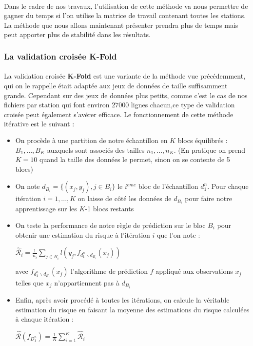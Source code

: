 \documentclass[14pt, openany]{article}
\begin{document}
\paragraph{}
Dans le cadre de nos travaux, l'utilisation de cette méthode va nous permettre de gagner du temps si l'on utilise la matrice de travail contenant toutes les stations. La méthode que nous allons maintenant présenter prendra plus de temps mais peut apporter plus de stabilité dans les résultats.
\subsubsection{La validation croisée K-Fold}
\paragraph{}
La validation croisée \textbf{K-Fold} est une variante de la méthode vue précédemment, qui on le rappelle était adaptée aux jeux de données de taille suffisamment grande. Cependant sur des jeux de données plus petits, comme c'est le cas de nos fichiers par station qui font environ $27000$ lignes chacun,ce type de validation croisée peut également s'avérer efficace. Le fonctionnement de cette méthode itérative est le suivant :
\begin{itemize}
\item On procède à une partition de notre échantillon en $K$ blocs équilibrés : $B_1,...,B_K$ auxquels sont associés des tailles $n_1,...,n_K$. (En pratique on prend $K=10$ quand la taille des données le permet, sinon on se contente de 5 blocs)
\item On note $d_{B_i}=\{(x_j,y_j), j \in B_i\}$ le $i^{eme}$ bloc  de l'échantillon $d^{n}_{1}$. Pour chaque itération $i = 1,...,K$ on laisse de côté les données de $d_{B_i}$ pour faire notre apprentissage sur les $K$-1 blocs restants
\item On teste la performance de notre règle de prédiction sur le bloc $B_i$ pour obtenir une estimation du risque à l'itération $i$ que l'on note :
\begin{center}
$\widehat{\mathcal{R}}_i = \frac{1}{n_i} \sum\limits_{j \in B_i} l(y_j,f_{d^{n}_{1}\backslash d_{B_i}}(x_j))$
\end{center}
avec $f_{d^{n}_{1}\backslash d_{B_i}}(x_j)$ l'algorithme de prédiction $f$ appliqué aux observations $x_j$ telles que $x_j$ n'appartiennent pas à $d_{B_i}$
\item Enfin, après avoir procédé à toutes les itérations, on calcule la véritable estimation du risque en faisant la moyenne des estimations du risque calculées à chaque itération :
\begin{center}
$\widehat{\mathcal{R}}(f_{D^{n}_{1}}) = \frac{1}{K} \sum\limits_{i=1}^K \widehat{\mathcal{R}}_i$
\end{center}
\end{itemize}
\end{document}
